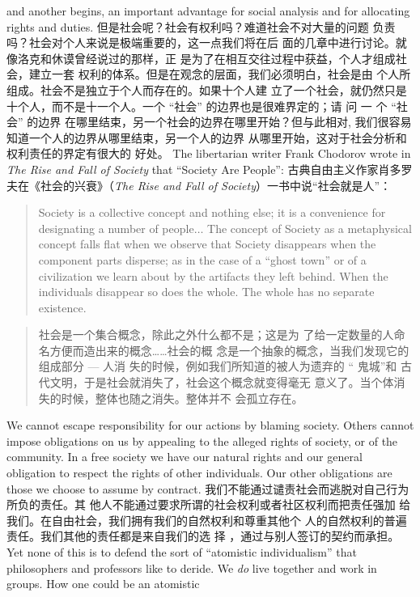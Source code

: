 \begin{paracol}{2}
and another begins, an important advantage for social analysis
and for allocating rights and duties.
\switchcolumn
但是社会呢？社会有权利吗？难道社会不对大量的问题
负责吗？社会对个人来说是极端重要的，这一点我们将在后
面的几章中进行讨论。就像洛克和休谟曾经说过的那样，正
是为了在相互交往过程中获益，个人才组成社会，建立一套
权利的体系。但是在观念的层面，我们必须明白，社会是由
个人所组成。社会不是独立于个人而存在的。如果十个人建
立了一个社会，就仍然只是十个人，而不是十一个人。一个
“社会” 的边界也是很难界定的；请 问 一 个 “社会” 的边界
在哪里结束，另一个社会的边界在哪里开始？但与此相对,
我们很容易知道一个人的边界从哪里结束，另一个人的边界
从哪里开始，这对于社会分析和权利责任的界定有很大的
好处。
\switchcolumn*
The libertarian writer Frank Chodorov wrote in \textit{The Rise and Fall of Society} that ``Society Are People'':
\switchcolumn
古典自由主义作家肖多罗夫在《社会的兴衰》（\textit{The Rise and Fall of Society}）一书中说“社会就是人”：
\switchcolumn*
\begin{quote}
Society is a collective concept and nothing else; it is a convenience for designating a number of people$\ldots$ The concept of Society as a metaphysical concept falls flat when we observe that
Society disappears when the component parts disperse; as in the
case of a ``ghost town'' or of a civilization we learn about by the
artifacts they left behind. When the individuals disappear so does
the whole. The whole has no separate existence.
\end{quote}
\switchcolumn
\begin{quote}
社会是一个集合概念，除此之外什么都不是；这是为
了给一定数量的人命名方便而造出来的概念……社会的概
念是一个抽象的概念，当我们发现它的组成部分 --- 人消
失的时候，例如我们所知道的被人为遗弃的 “ 鬼城”和
古代文明，于是社会就消失了，社会这个概念就变得毫无
意义了。当个体消失的时候，整体也随之消失。整体并不
会孤立存在。
\end{quote}
\switchcolumn*
We cannot escape responsibility for our actions by blaming society. Others cannot impose obligations on us by appealing to
the alleged rights of society, or of the community. In a free society we have our natural rights and our general obligation to respect the rights of other individuals. Our other obligations are
those we choose to assume by contract.
\switchcolumn
我们不能通过谴责社会而逃脱对自己行为所负的责任。其
他人不能通过要求所谓的社会权利或者社区权利而把责任强加
给我们。在自由社会，我们拥有我们的自然权利和尊重其他个
人的自然权利的普遍责任。我们其他的责任都是来自我们的选
择 ，通过与别人签订的契约而承担。
\switchcolumn*
Yet none of this is to defend the sort of ``atomistic individualism'' that philosophers and professors like to deride. We \textit{do} live together and work in groups. How one could be an atomistic

\end{paracol}
